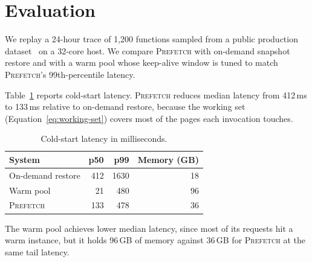\section{Evaluation}
\label{sec:results}

We replay a 24-hour trace of 1{,}200 functions sampled from a public production
dataset~\cite{shahrad2020serverless} on a 32-core host. We compare
\textsc{Prefetch} with on-demand snapshot restore and with a warm pool whose
keep-alive window is tuned to match \textsc{Prefetch}'s 99th-percentile latency.

Table~\ref{tab:latency} reports cold-start latency. \textsc{Prefetch} reduces
median latency from 412\,ms to 133\,ms relative to on-demand restore, because
the working set (Equation~\ref{eq:working-set}) covers most of the pages each
invocation touches.

\begin{table}[t]
  \centering
  \caption{Cold-start latency in milliseconds.}
  \label{tab:latency}
  \begin{tabular}{lrrr}
    \toprule
    System & p50 & p99 & Memory (GB) \\
    \midrule
    On-demand restore & 412 & 1630 & 18 \\
    Warm pool         &  21 &  480 & 96 \\
    \textsc{Prefetch} & 133 &  478 & 36 \\
    \bottomrule
  \end{tabular}
\end{table}

The warm pool achieves lower median latency, since most of its requests hit a
warm instance, but it holds 96\,GB of memory against 36\,GB for
\textsc{Prefetch} at the same tail latency.
